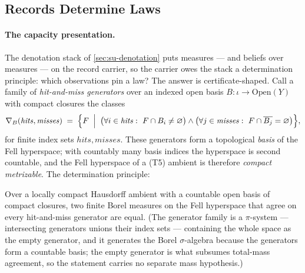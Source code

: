 \subsection{Records Determine Laws}

\paragraph{The capacity presentation.}
The denotation stack of \autoref{sec:su-denotation} puts measures
--- and beliefs over measures --- on the record carrier,
so the carrier owes the stack a determination principle: which
observations pin a law? The answer is certificate-shaped. Call a
family of \emph{hit-and-miss generators} over an indexed open basis
$B \colon \iota \to \mathrm{Open}(Y)$ with compact closures the
classes
\[
  \nabla_B(\mathit{hits}, \mathit{misses}) \;=\;
  \Bigl\{F \;\Bigm|\;
    \bigl(\forall i \in \mathit{hits}:\ F \cap B_i \neq \varnothing\bigr)
    \wedge
    \bigl(\forall j \in \mathit{misses}:\ F \cap \overline{B_j} =
    \varnothing\bigr)\Bigr\},
\]
for finite index sets $\mathit{hits}, \mathit{misses}$. These
generators form a topological \emph{basis} of the Fell hyperspace;
with countably many basis indices the hyperspace is second countable,
and the Fell hyperspace of
a (T5) ambient is therefore \emph{compact metrizable}. The
determination principle:

\begin{theorem}
\label{thm:su-capacity}
Over a locally compact Hausdorff ambient with a countable open basis
of compact closures, two finite Borel measures on the Fell hyperspace
that agree on every hit-and-miss generator are equal. (The generator
family is a $\pi$-system --- intersecting generators unions their
index sets --- containing the whole space as the empty generator, and
it generates the Borel $\sigma$-algebra because the generators form a
countable basis; the empty generator is what subsumes total-mass
agreement, so the statement carries no separate mass hypothesis.)
\end{theorem}


